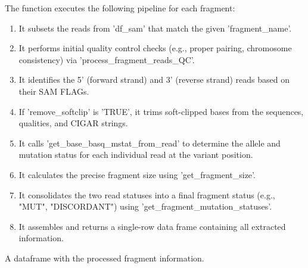 \documentclass[a4paper]{book}
\begin{document}
%
\begin{Details}
The function executes the following pipeline for each fragment:
\begin{enumerate}

\item{} It subsets the reads from 'df\_sam' that match the given 'fragment\_name'.
\item{} It performs initial quality control checks (e.g., proper pairing,
chromosome consistency) via 'process\_fragment\_reads\_QC'.
\item{} It identifies the 5' (forward strand) and 3' (reverse strand) reads
based on their SAM FLAGs.
\item{} If 'remove\_softclip' is 'TRUE', it trims soft-clipped bases from the
sequences, qualities, and CIGAR strings.
\item{} It calls 'get\_base\_basq\_mstat\_from\_read' to determine the allele and
mutation status for each individual read at the variant position.
\item{} It calculates the precise fragment size using 'get\_fragment\_size'.
\item{} It consolidates the two read statuses into a final fragment status
(e.g., "MUT", "DISCORDANT") using 'get\_fragment\_mutation\_statuses'.
\item{} It assembles and returns a single-row data frame containing all
extracted information.

\end{enumerate}

\end{Details}
%
\begin{Value}
A dataframe with the processed fragment information.
\end{Value}
%
\end{document}
